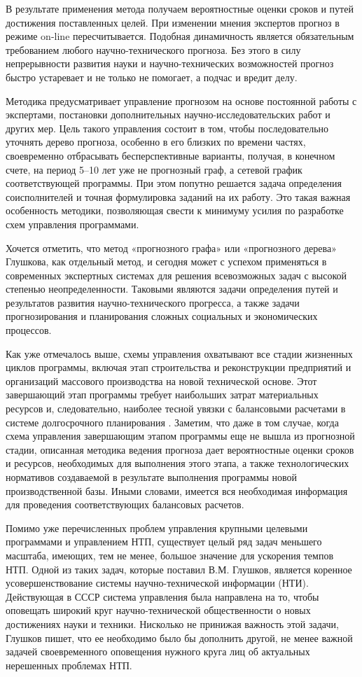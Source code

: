 В результате применения метода получаем вероятностные оценки сроков и путей
достижения поставленных целей. При изменении мнения экспертов прогноз в режиме
on-line пересчитывается. Подобная динамичность является обязательным требованием
любого научно-технического прогноза. Без этого в силу непрерывности развития
науки и научно-технических возможностей прогноз быстро устаревает и не только не
помогает, а подчас и вредит делу.
 
Методика предусматривает управление прогнозом на основе постоянной работы с
экспертами, постановки дополнительных научно-исследовательских работ и других
мер. Цель такого управления состоит в том, чтобы последовательно уточнять дерево
прогноза, особенно в его близких по времени частях, своевременно отбрасывать
бесперспективные варианты, получая, в конечном счете, на период 5--10 лет уже не
прогнозный граф, а сетевой график соответствующей программы. При этом попутно
решается задача определения соисполнителей и точная формулировка заданий на их
работу. Это такая важная особенность методики, позволяющая свести к минимуму
усилия по разработке схем управления программами.
 
Хочется отметить, что метод «прогнозного графа» или «прогнозного дерева»
Глушкова, как отдельный метод, и сегодня может с успехом применяться в 
современных экспертных системах для решения всевозможных задач с высокой
степенью неопределенности. Таковыми являются задачи определения путей и
результатов развития научно-технического прогресса, а также задачи
прогнозирования и планирования сложных социальных и экономических процессов.
 
Как уже отмечалось выше, схемы управления охватывают все стадии жизненных циклов
программы, включая этап строительства и реконструкции предприятий и организаций
массового производства на новой технической основе. Этот завершающий этап
программы требует наибольших затрат материальных ресурсов и, следовательно,
наиболее тесной увязки с балансовыми расчетами в системе долгосрочного
планирования \cite{b5}. Заметим, что даже в том случае, когда схема управления
завершающим этапом программы еще не вышла из прогнозной стадии, описанная
методика ведения прогноза дает вероятностные оценки сроков и ресурсов,
необходимых для выполнения этого этапа, а также технологических нормативов
создаваемой в результате выполнения программы новой производственной базы. Иными
словами, имеется вся необходимая информация для проведения соответствующих
балансовых расчетов.
 
Помимо уже перечисленных проблем управления крупными целевыми программами и
управлением НТП, существует целый ряд задач меньшего масштаба, имеющих, тем не
менее, большое значение для ускорения темпов НТП. Одной из таких задач, которые
поставил В.М. Глушков, является коренное усовершенствование системы
научно-технической информации (НТИ). Действующая в СССР система управления была
направлена на то, чтобы оповещать широкий круг научно-технической общественности
о новых достижениях науки и техники. Нисколько не принижая важность этой задачи,
Глушков пишет, что ее необходимо было бы дополнить другой, не менее важной
задачей своевременного оповещения нужного круга лиц об актуальных нерешенных
проблемах НТП.
 
